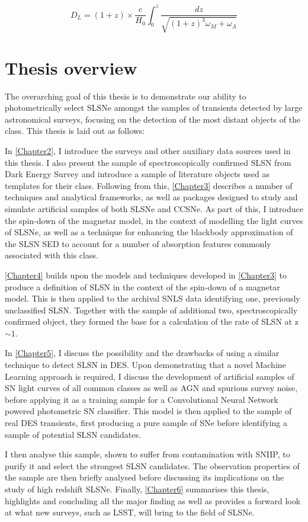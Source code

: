 \begin{equation} \label{eq:LumDist}
  D_L = (1+z) \times \frac{c}{H_0} \int^{z}_{0} \frac{dz}{\sqrt{(1+z)^3 \omega_M + \omega_{\Lambda}}}
\end{equation}

\section{Thesis overview}
The overarching goal of this thesis is to demonstrate our ability to photometrically select SLSNe amongst the samples of transients detected by large astronomical surveys, focusing on the detection of the most distant objects of the class. This thesis is laid out as follows:

In \cref{Chapter2}, I introduce the surveys and other auxiliary data sources used in this thesis. I also present the sample of spectroscopically confirmed SLSN from Dark Energy Survey and introduce a sample of literature objects used as templates for their class. Following from this, \cref{Chapter3} describes a number of techniques and analytical frameworks, as well as packages designed to study and simulate artificial samples of both SLSNe and CCSNe. As part of this, I introduce the spin-down of the magnetar model, in the context of modelling the light curves of SLSNe, as well as a technique for enhancing the blackbody approximation of the SLSN SED to account for a number of absorption features commonly associated with this class.

\cref{Chapter4} builds upon the models and techniques developed in \cref{Chapter3} to produce a definition of SLSN in the context of the spin-down of a magnetar model. This is then applied to the archival SNLS data identifying one, previously unclassified SLSN. Together with the sample of additional two, spectroscopically confirmed object, they formed the base for a calculation of the rate of SLSN at z$\sim$1.

In \cref{Chapter5}, I discuss the possibility and the drawbacks of using a similar technique to detect SLSN in DES. Upon demonstrating that a novel Machine Learning approach is required, I discuss the development of artificial samples of SN light curves of all common classes as well as AGN and spurious survey noise, before applying it as a training sample for a Convolutional Neural Network powered photometric SN classifier. This model is then applied to the sample of real DES transients, first producing a pure sample of SNe before identifying a sample of potential SLSN candidates.

I then analyse this sample, shown to suffer from contamination with SNIIP, to purify it and select the strongest SLSN candidates. The observation properties of the sample are then briefly analysed before discussing its implications on the study of high redshift SLSNe. Finally, \cref{Chapter6} summarises this thesis, highlights and concluding all the major finding as well as provides a forward look at what new surveys, such as LSST, will bring to the field of SLSNe.
